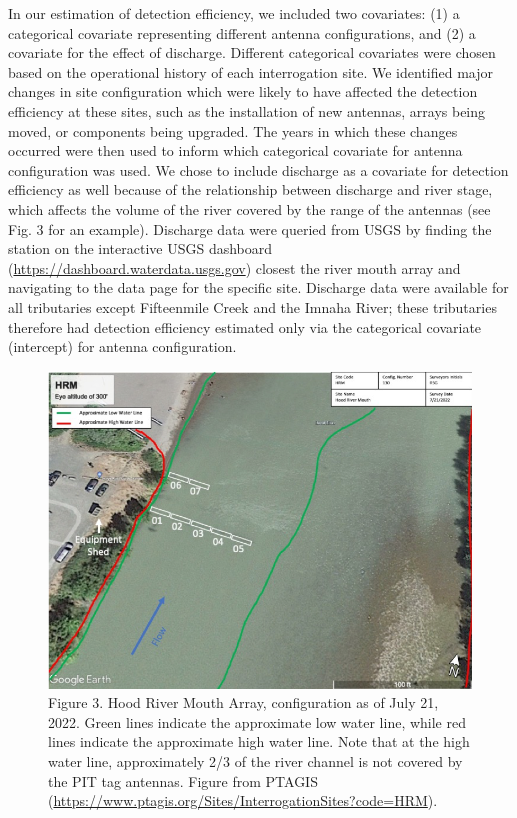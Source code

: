 \documentclass[
  12pt,
]{report}
\begin{document}
In our estimation of detection efficiency, we included two covariates:
(1) a categorical covariate representing different antenna
configurations, and (2) a covariate for the effect of discharge.
Different categorical covariates were chosen based on the operational
history of each interrogation site. We identified major changes in site
configuration which were likely to have affected the detection
efficiency at these sites, such as the installation of new antennas,
arrays being moved, or components being upgraded. The years in which
these changes occurred were then used to inform which categorical
covariate for antenna configuration was used. We chose to include
discharge as a covariate for detection efficiency as well because of the
relationship between discharge and river stage, which affects the volume
of the river covered by the range of the antennas (see Fig. 3 for an
example). Discharge data were queried from USGS by finding the station
on the interactive USGS dashboard
(\url{https://dashboard.waterdata.usgs.gov}) closest the river mouth
array and navigating to the data page for the specific site. Discharge
data were available for all tributaries except Fifteenmile Creek and the
Imnaha River; these tributaries therefore had detection efficiency
estimated only via the categorical covariate (intercept) for antenna
configuration.

\begin{figure}
\centering
\includegraphics[width=1.3\textwidth,height=\textheight]{.//figures/hood_river_site.png}
\caption{Figure 3. Hood River Mouth Array, configuration as of July 21,
2022. Green lines indicate the approximate low water line, while red
lines indicate the approximate high water line. Note that at the high
water line, approximately 2/3 of the river channel is not covered by the
PIT tag antennas. Figure from PTAGIS
(\url{https://www.ptagis.org/Sites/InterrogationSites?code=HRM}).}
\end{figure}
\end{document}
